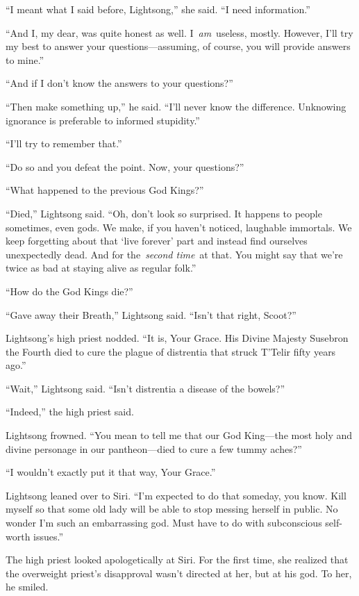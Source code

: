 “I meant what I said before, Lightsong,” she said. “I need information.”

“And I, my dear, was quite honest as well. I~\textit{am}~useless, mostly. However, I’ll try my best to answer your questions—assuming, of course, you will provide answers to mine.”

“And if I don’t know the answers to your questions?”

“Then make something up,” he said. “I’ll never know the difference. Unknowing ignorance is preferable to informed stupidity.”

“I’ll try to remember that.”

“Do so and you defeat the point. Now, your questions?”

“What happened to the previous God Kings?”

“Died,” Lightsong said. “Oh, don’t look so surprised. It happens to people sometimes, even gods. We make, if you haven’t noticed, laughable immortals. We keep forgetting about that ‘live forever’ part and instead find ourselves unexpectedly dead. And for the~\textit{second time}~at that. You might say that we’re twice as bad at staying alive as regular folk.”

“How do the God Kings die?”

“Gave away their Breath,” Lightsong said. “Isn’t that right, Scoot?”

Lightsong’s high priest nodded. “It is, Your Grace. His Divine Majesty Susebron the Fourth died to cure the plague of distrentia that struck T’Telir fifty years ago.”

“Wait,” Lightsong said. “Isn’t distrentia a disease of the bowels?”

“Indeed,” the high priest said.

Lightsong frowned. “You mean to tell me that our God King—the most holy and divine personage in our pantheon—died to cure a few tummy aches?”

“I wouldn’t exactly put it that way, Your Grace.”

Lightsong leaned over to Siri. “I’m expected to do that someday, you know. Kill myself so that some old lady will be able to stop messing herself in public. No wonder I’m such an embarrassing god. Must have to do with subconscious self-worth issues.”

The high priest looked apologetically at Siri. For the first time, she realized that the overweight priest’s disapproval wasn’t directed at her, but at his god. To her, he smiled.

